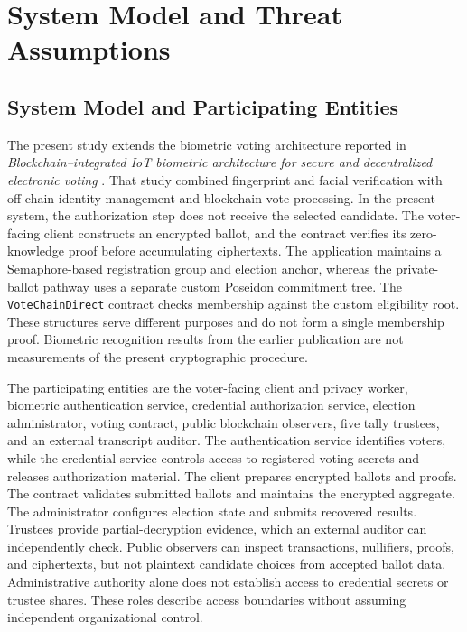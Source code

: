 \section{System Model and Threat Assumptions}
\label{sec:03}
\label{sec:system-model}

\subsection{System Model and Participating Entities}
\label{subsec:system-entities}

The present study extends the biometric voting architecture reported in
\emph{Blockchain--integrated IoT biometric architecture for secure and
decentralized electronic voting} \citep{rifat2026biometric}. That study
combined fingerprint and facial verification with off-chain identity
management and blockchain vote processing. In the present system, the
authorization step does not receive the selected candidate. The voter-facing
client constructs an encrypted ballot, and the contract verifies its
zero-knowledge proof before accumulating ciphertexts. The application
maintains a Semaphore-based registration group and election anchor, whereas
the private-ballot pathway uses a separate custom Poseidon commitment tree.
The \texttt{VoteChainDirect} contract checks membership against the custom
eligibility root. These structures serve different purposes and do not form
a single membership proof. Biometric recognition results from the earlier
publication are not measurements of the present cryptographic procedure.

The participating entities are the voter-facing client and privacy worker,
biometric authentication service, credential authorization service,
election administrator, voting contract, public blockchain observers, five
tally trustees, and an external transcript auditor. The authentication
service identifies voters, while the credential service controls access
to registered voting secrets and releases authorization material. The
client prepares encrypted ballots and proofs. The contract validates
submitted ballots and maintains the encrypted aggregate. The administrator
configures election state and submits recovered results. Trustees provide
partial-decryption evidence, which an external auditor can independently
check. Public observers can inspect transactions, nullifiers, proofs, and
ciphertexts, but not plaintext candidate choices from accepted ballot data.
Administrative authority alone does not establish access to credential
secrets or trustee shares. These roles describe access boundaries without
assuming independent organizational control.


